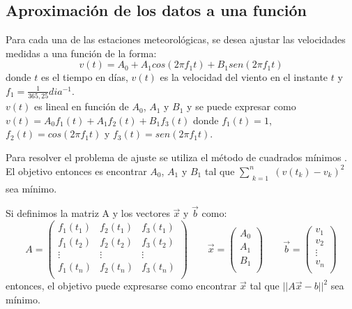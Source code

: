 \documentclass[journal, monochrome]{IEEEtran}
\begin{document}
\subsection{Aproximación de los datos a una función}
\par
Para cada una de las estaciones meteorológicas, se desea ajustar las velocidades medidas a una función de la forma:
\begin{equation}
v(t) = A_{0} + A_{1}cos(2\pi f_{1}t) + B_{1}sen(2\pi f_{1}t)
\label{equation:model}
\end{equation}
donde $t$ es el tiempo en días, $v(t)$ es la velocidad del viento en el instante $t$ y $f_{1} = \frac{1}{365,25} dia^{-1}$. \\
$v(t)$ es lineal en función de $A_{0}$, $A_{1}$ y $B_{1}$ y se puede expresar como $v(t) = A_{0}f_{1}(t) + A_{1}f_{2}(t) + B_{1}f_{3}(t)$ donde $f_{1}(t) = 1$, $f_{2}(t) = cos(2\pi f_{1}t)$ y $f_{3}(t) = sen(2\pi f_{1}t)$.
\par
Para resolver el problema de ajuste se utiliza el método de cuadrados mínimos \citep{mathews}. El objetivo entonces es encontrar $A_{0}$, $A_{1}$ y $B_{1}$ tal que 
$\displaystyle\sum_{\substack{k=1}}^{n} (v(t_{k})- v_{k})^{2} $ sea mínimo.
\par
Si definimos la matriz A y los vectores $\vec{x}$ y $\vec{b}$ como:
\begin{equation}
A = \left(\begin{array}{ccc}
f_{1}(t_{1}) & f_{2}(t_{1}) & f_{3}(t_{1}) \\
f_{1}(t_{2}) & f_{2}(t_{2}) & f_{3}(t_{2}) \\
\vdots & \vdots & \vdots \\
f_{1}(t_{n}) & f_{2}(t_{n}) & f_{3}(t_{n}) \\
\end{array} \right) \qquad
\vec{x} = \left(\begin{array}{c}
A_{0} \\
A_{1} \\
B_{1} \\
\end{array} \right) \qquad
\vec{b} = \left(\begin{array}{c}
v_{1} \\
v_{2} \\
\vdots \\
v_{n} \\
\end{array} \right)
\end{equation}
entonces, el objetivo puede expresarse como encontrar $\vec{x}$ tal que $||A\vec{x} - {b}||^{2}$ sea mínimo.
\end{document}
